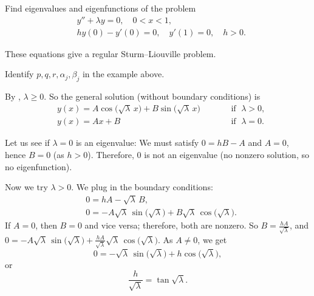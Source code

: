 \begin{example}
Find eigenvalues and eigenfunctions of the problem
\begin{align*}
& y''+\lambda y = 0, \quad 0 < x < 1 , \\
& hy(0)- y'(0) = 0, \quad y'(1)  = 0, \quad h > 0.
\end{align*}

These equations give a regular Sturm--Liouville problem.

\begin{exercise}
Identify $p, q, r, \alpha_j, \beta_j$ in the example above.
\end{exercise}

By ,
$\lambda \geq 0$.
So the general solution (without boundary conditions) is
\begin{equation*}
\begin{aligned}
 & y(x) = A \cos \bigl( \sqrt{\lambda}\, x\bigr)
+ B \sin \bigl( \sqrt{\lambda}\, x\bigr) & & \qquad \text{if } \; \lambda > 0 , \\
& y(x) = A x + B & & \qquad \text{if } \; \lambda = 0 .
\end{aligned}
\end{equation*}

Let us see if $\lambda = 0$ is an eigenvalue:
We must satisfy $0 = hB - A$ and $A = 0$, hence $B=0$ (as $h > 0$).
Therefore, 0 is not an eigenvalue (no nonzero solution, so no eigenfunction).

Now we
try $\lambda > 0$.  We plug in the boundary conditions:
\begin{align*}
& 0 = h A - \sqrt{\lambda}\, B , \\
& 0 = -A \sqrt{\lambda}\, \sin \bigl(\sqrt{\lambda}\bigr)
+ B \sqrt{\lambda}\, \cos \bigl(\sqrt{\lambda}\bigr) .
\end{align*}
If $A=0$, then $B=0$ and vice versa; therefore, both are nonzero.
So $B = \frac{hA}{\sqrt{\lambda}}$, and
$0 = -A \sqrt{\lambda}\, \sin \bigl( \sqrt{\lambda}\bigr) + \frac{hA}{\sqrt{\lambda}}
\sqrt{\lambda}\, \cos \bigl( \sqrt{\lambda}\bigr)$.  As $A \neq 0$, we get
\begin{equation*}
0 = 
- \sqrt{\lambda}\, \sin \bigl( \sqrt{\lambda}\bigr)
+ h \cos \bigl( \sqrt{\lambda}\bigr) ,
\end{equation*}
or
\begin{equation*}
\frac{h}{\sqrt{\lambda}} = \tan \sqrt{\lambda} .
\end{equation*}


\end{example}
